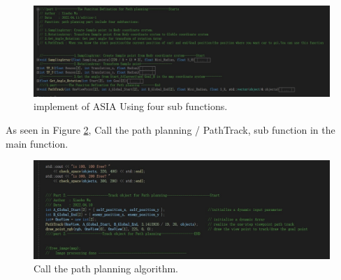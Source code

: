     \begin{figure}[thb]
        \centering
        \includegraphics[width=1\textwidth]{images/part1.png}
        \caption[implement of ASIA Using four sub functions]{implement of ASIA Using four sub functions.}\label{part_1}
    \end{figure}
    

As seen in Figure \ref{part2}, Call the path planning / PathTrack, sub function in the main function.

    \begin{figure}[thb]
        \centering
        \includegraphics[width=1\textwidth]{images/part2.png}
        \caption[Call the path planning algorithm]{Call the path planning algorithm.}\label{part2}
    \end{figure}


